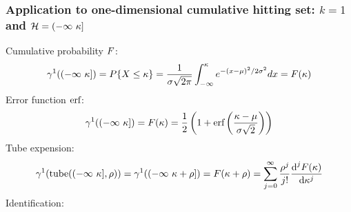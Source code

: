 \documentclass[a4paper,12pt]{article}
\begin{document}
\subsubsection{Application to one-dimensional cumulative hitting set: $k=1$ and $\mathcal{H}=(-\infty\ \kappa]$}
Cumulative probability $F$:
\begin{equation}
  \gamma^1((-\infty\ \kappa]) = P\{X\le\kappa\}=\frac{1}{\sigma\sqrt{2\pi}} \int_{-\infty}^\kappa e^{-(x-\mu)^2/2\sigma^2} dx=F(\kappa)
\end{equation}
Error function $\text{erf}$:
\begin{equation}
  \gamma^1((-\infty\ \kappa])=F(\kappa)=\frac{1}{2}\left(1+\text{erf}\left(\frac{\kappa-\mu}{\sigma\sqrt{2}}\right)\right)
\end{equation}
Tube expension:
\begin{equation}
  \GaussMeas^1(\tube(\minfu,\ray))=\GaussMeas^1((-\infty\ \lset+\ray])=\CDP(\lset+\ray)=\sum_{j=0}^{\infty} \frac{\ray^j}{j!} \frac{\text{d}^j \CDP(\lset)}{\text{d} \lset^j}
\end{equation}
Identification:
\end{document}
